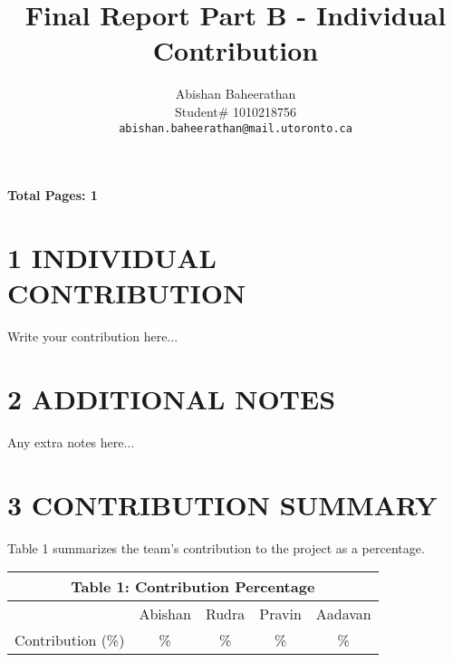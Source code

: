 \documentclass{article}
\title{Final Report Part B - Individual Contribution}
\author{
Abishan Baheerathan \\
Student\# 1010218756 \\
\texttt{abishan.baheerathan@mail.utoronto.ca}
}
\begin{document}
\maketitle

\noindent\textbf{Total Pages: 1}

\section*{1 \hspace{2pt} INDIVIDUAL CONTRIBUTION}
Write your contribution here...

\section*{2 \hspace{2pt} ADDITIONAL NOTES}
Any extra notes here...

\section*{3 \hspace{2pt} CONTRIBUTION SUMMARY}
Table 1 summarizes the team's contribution to the project as a percentage.

\begin{center}
    \small
    \setlength{\tabcolsep}{8pt}
    \renewcommand{\arraystretch}{1.05}
    \begin{tabular}{lcccc}
        \multicolumn{5}{c}{\textbf{Table 1: Contribution Percentage}} \\
        \toprule
                          & Abishan & Rudra & Pravin & Aadavan        \\
        \midrule
        Contribution (\%) & \%      & \%    & \%     & \%             \\
        \bottomrule
    \end{tabular}
    \label{tab:contrib}
\end{center}

\clearpage
{}
\label{last_page}
\end{document}
